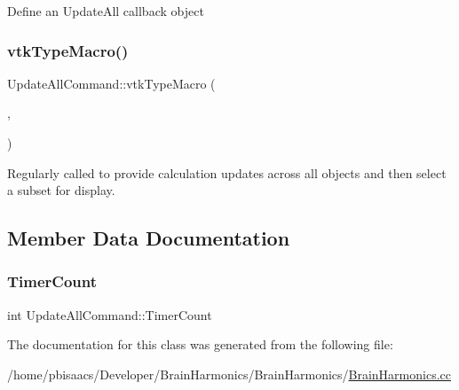 Define an Update\+All callback object\mbox{\label{classUpdateAllCommand_a228565b2a2306d425dc7eb3cda4d39a4}} 
\subsubsection{\texorpdfstring{vtk\+Type\+Macro()}{vtkTypeMacro()}}
{\footnotesize\ttfamily Update\+All\+Command\+::vtk\+Type\+Macro (\begin{DoxyParamCaption}\item[{\mbox{\hyperlink{classUpdateAllCommand}{Update\+All\+Command}}}]{,  }\item[{vtk\+Command}]{ }\end{DoxyParamCaption})}

Regularly called to provide calculation updates across all objects and then select a subset for display. 

\subsection{Member Data Documentation}
\mbox{\label{classUpdateAllCommand_a66ba9400072105306ca48a58470014dc}} 
\subsubsection{\texorpdfstring{Timer\+Count}{TimerCount}}
{\footnotesize\ttfamily int Update\+All\+Command\+::\+Timer\+Count\hspace{0.3cm}{\ttfamily [private]}}



The documentation for this class was generated from the following file\+:\begin{DoxyCompactItemize}
\item 
/home/pbisaacs/\+Developer/\+Brain\+Harmonics/\+Brain\+Harmonics/\mbox{\hyperlink{BrainHarmonics_8cc}{Brain\+Harmonics.\+cc}}\end{DoxyCompactItemize}
